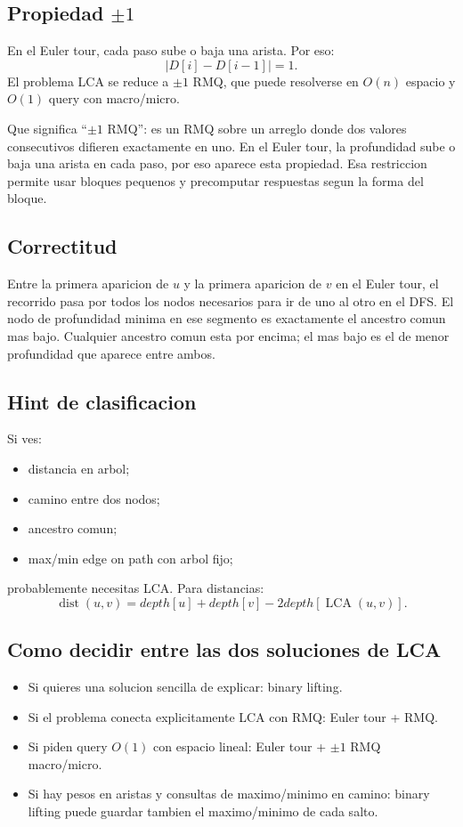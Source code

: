 \documentclass[10pt]{article}
\newcommand{\bigO}{O}
\newcommand{\LCA}{\operatorname{LCA}}
\begin{document}
\subsection{Propiedad $\pm 1$}
En el Euler tour, cada paso sube o baja una arista. Por eso:
\[
|D[i]-D[i-1]|=1.
\]
El problema LCA se reduce a $\pm 1$ RMQ, que puede resolverse en $\bigO(n)$
espacio y $\bigO(1)$ query con macro/micro.

Que significa ``$\pm1$ RMQ'': es un RMQ sobre un arreglo donde dos valores
consecutivos difieren exactamente en uno. En el Euler tour, la profundidad sube
o baja una arista en cada paso, por eso aparece esta propiedad. Esa restriccion
permite usar bloques pequenos y precomputar respuestas segun la forma del bloque.

\subsection{Correctitud}
Entre la primera aparicion de $u$ y la primera aparicion de $v$ en el Euler tour,
el recorrido pasa por todos los nodos necesarios para ir de uno al otro en el
DFS. El nodo de profundidad minima en ese segmento es exactamente el ancestro
comun mas bajo. Cualquier ancestro comun esta por encima; el mas bajo es el de
menor profundidad que aparece entre ambos.

\subsection{Hint de clasificacion}
Si ves:
\begin{itemize}[leftmargin=*]
\item distancia en arbol;
\item camino entre dos nodos;
\item ancestro comun;
\item max/min edge on path con arbol fijo;
\end{itemize}
probablemente necesitas LCA. Para distancias:
\[
\operatorname{dist}(u,v)=depth[u]+depth[v]-2depth[\LCA(u,v)].
\]

\subsection{Como decidir entre las dos soluciones de LCA}
\begin{itemize}[leftmargin=*]
\item Si quieres una solucion sencilla de explicar: binary lifting.
\item Si el problema conecta explicitamente LCA con RMQ: Euler tour + RMQ.
\item Si piden query $\bigO(1)$ con espacio lineal: Euler tour + $\pm1$ RMQ
macro/micro.
\item Si hay pesos en aristas y consultas de maximo/minimo en camino: binary
lifting puede guardar tambien el maximo/minimo de cada salto.
\end{itemize}
\end{document}
